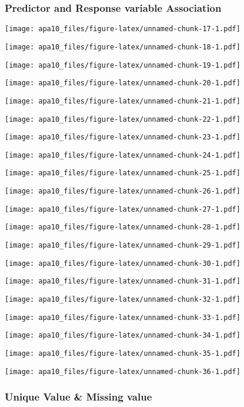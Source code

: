 \documentclass[english,floatsintext,man]{apa6}
\begin{document}
\subsubsection{Predictor and Response variable
Association}\label{predictor-and-response-variable-association}

\texttt{[image: apa10\_files/figure-latex/unnamed-chunk-17-1.pdf]}

\texttt{[image: apa10\_files/figure-latex/unnamed-chunk-18-1.pdf]}

\texttt{[image: apa10\_files/figure-latex/unnamed-chunk-19-1.pdf]}

\texttt{[image: apa10\_files/figure-latex/unnamed-chunk-20-1.pdf]}

\texttt{[image: apa10\_files/figure-latex/unnamed-chunk-21-1.pdf]}

\texttt{[image: apa10\_files/figure-latex/unnamed-chunk-22-1.pdf]}

\texttt{[image: apa10\_files/figure-latex/unnamed-chunk-23-1.pdf]}

\texttt{[image: apa10\_files/figure-latex/unnamed-chunk-24-1.pdf]}

\texttt{[image: apa10\_files/figure-latex/unnamed-chunk-25-1.pdf]}

\texttt{[image: apa10\_files/figure-latex/unnamed-chunk-26-1.pdf]}

\texttt{[image: apa10\_files/figure-latex/unnamed-chunk-27-1.pdf]}

\texttt{[image: apa10\_files/figure-latex/unnamed-chunk-28-1.pdf]}

\texttt{[image: apa10\_files/figure-latex/unnamed-chunk-29-1.pdf]}

\texttt{[image: apa10\_files/figure-latex/unnamed-chunk-30-1.pdf]}

\texttt{[image: apa10\_files/figure-latex/unnamed-chunk-31-1.pdf]}

\texttt{[image: apa10\_files/figure-latex/unnamed-chunk-32-1.pdf]}

\texttt{[image: apa10\_files/figure-latex/unnamed-chunk-33-1.pdf]}

\texttt{[image: apa10\_files/figure-latex/unnamed-chunk-34-1.pdf]}

\texttt{[image: apa10\_files/figure-latex/unnamed-chunk-35-1.pdf]}

\texttt{[image: apa10\_files/figure-latex/unnamed-chunk-36-1.pdf]}

\subsubsection{Unique Value \& Missing
value}\label{unique-value-missing-value}
\end{document}
